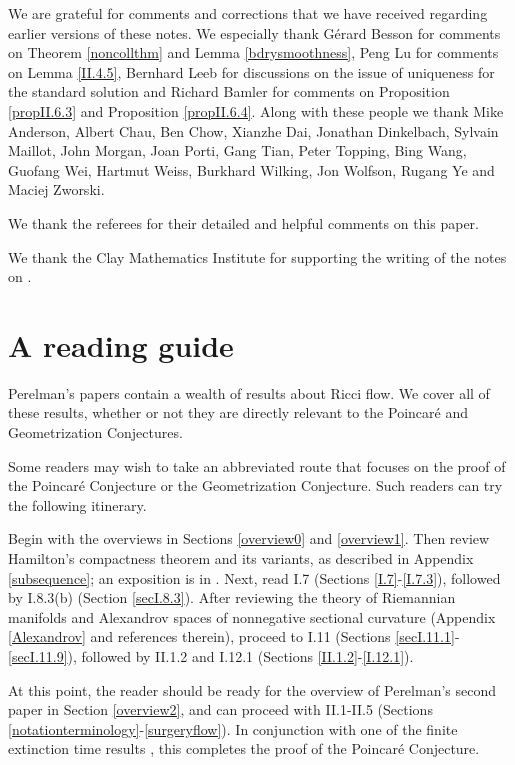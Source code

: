 \documentclass[12pt]{amsart}
\numberwithin{equation}{section}
\theoremstyle{plain}
\theoremstyle{definition}
\theoremstyle{remark}
\begin{document}
We are grateful for comments and corrections that we have
received regarding earlier versions of these
notes.  
We especially thank G\'erard Besson for comments on Theorem
\ref{noncollthm} and Lemma \ref{bdrysmoothness}, Peng Lu for
comments on Lemma \ref{II.4.5}, Bernhard Leeb for
discussions on the issue of uniqueness for the standard
solution and Richard Bamler for comments on 
Proposition \ref{propII.6.3} and Proposition \ref{propII.6.4}.
Along with these people we thank
Mike Anderson, Albert Chau,
Ben Chow, Xianzhe Dai, Jonathan Dinkelbach,
Sylvain Maillot, John Morgan, 
Joan Porti, Gang Tian, Peter Topping, Bing Wang, 
Guofang Wei, Hartmut Weiss, 
Burkhard Wilking, Jon Wolfson, Rugang Ye and Maciej Zworski.


We thank the referees for their detailed and helpful comments on
this paper.


We thank the Clay Mathematics Institute for supporting the writing
of the notes on \cite{Perelman2}.


\tableofcontents


\section{A reading guide}

Perelman's papers contain a wealth of results about Ricci flow.
We cover all of these results, whether or not they
are directly relevant to the Poincar\'e and Geometrization Conjectures.

Some readers may wish to take an abbreviated route that
focuses on the proof of the 
Poincar\'e Conjecture or the Geometrization Conjecture.
Such readers can try the following itinerary.  

Begin with the overviews in Sections \ref{overview0} and \ref{overview1}.
Then review Hamilton's compactness theorem and its variants, as described in
Appendix \ref{subsequence}; an exposition is in 
\cite[Chapter 7]{Topping}. 
Next, read I.7 (Sections \ref{I.7}-\ref{I.7.3}),
followed by I.8.3(b) (Section \ref{secI.8.3}).  
After reviewing the theory of Riemannian
manifolds and Alexandrov spaces of nonnegative sectional curvature 
(Appendix \ref{Alexandrov} and references therein),
proceed to I.11 (Sections \ref{secI.11.1}-\ref{secI.11.9}), followed by
II.1.2 and I.12.1 (Sections \ref{II.1.2}-\ref{I.12.1}).


At this point, the reader should be ready for 
the overview of Perelman's second paper in Section \ref{overview2},  and 
can proceed with II.1-II.5 (Sections
\ref{notationterminology}-\ref{surgeryflow}).  In conjunction with
one of the finite extinction time results 
\cite{Colding-Minicozzi,Colding-Minicozzi2,Perelman3},
this completes the proof of the Poincar\'e Conjecture.
\end{document}
